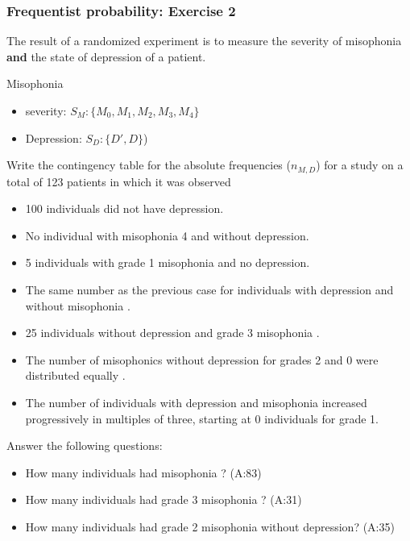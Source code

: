 \documentclass[
]{book}
\providecommand{\tightlist}{%
  \setlength{\itemsep}{0pt}\setlength{\parskip}{0pt}}
\begin{document}
\hypertarget{frequentist-probability-exercise-2}{%
\subsubsection{Frequentist probability: Exercise 2}\label{frequentist-probability-exercise-2}}

The result of a randomized experiment is to measure the severity of misophonia \textbf{and} the state of depression of a patient.

Misophonia

\begin{itemize}
\tightlist
\item
  severity: \(S_M:\{M_ 0,M _1,M_2,M_3,M_4\}\)
\item
  Depression: \(S_ D:\{ D', D\}\))
\end{itemize}

Write the contingency table for the absolute frequencies (\(n_{ M,D }\)) for a study on a total of 123 patients in which it was observed

\begin{itemize}
\tightlist
\item
  100 individuals did not have depression.
\item
  No individual with misophonia 4 and without depression.
\item
  5 individuals with grade 1 misophonia and no depression.
\item
  The same number as the previous case for individuals with depression and without misophonia .
\item
  25 individuals without depression and grade 3 misophonia .
\item
  The number of misophonics without depression for grades 2 and 0 were distributed equally .
\item
  The number of individuals with depression and misophonia increased progressively
  in multiples of three, starting at 0 individuals for grade 1.
\end{itemize}

Answer the following questions:

\begin{itemize}
\tightlist
\item
  How many individuals had misophonia ? (A:83)
\item
  How many individuals had grade 3 misophonia ? (A:31)
\item
  How many individuals had grade 2 misophonia without depression? (A:35)
\end{itemize}
\end{document}
